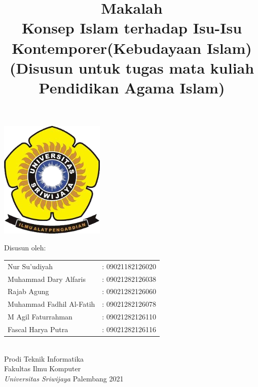 \documentclass[a4paper,12 pt]{article}%
\title{\textbf{Makalah}\linebreak \\ 
\textbf{Konsep Islam terhadap Isu-Isu Kontemporer(Kebudayaan Islam)}\\[1\baselineskip] 
\normalsize{\textbf{(Disusun untuk tugas mata kuliah Pendidikan Agama Islam)}}}
\date{}
\author{}
\begin{document}
\maketitle
{}%
\thispagestyle{empty}%

\begin{center}%
\includegraphics[width=5cm]{unsri.png}
\end{center}
\vspace{1 cm}


\begin{center}
    Disusun oleh:\\[1\baselineskip]
\begin{tabular}{ll} %
Nur Su'udiyah &: 09021182126020\\
Muhammad Dary Alfaris &: 09021282126038\\
Rajab Agung &: 09021282126060\\
Muhammad Fadhil Al-Fatih &: 09021282126078\\
M Agil Faturrahman &: 09021282126110\\
Fascal Harya Putra &: 09021282126116
\end{tabular}\\[2\baselineskip]

Prodi Teknik Informatika\\
Fakultas Ilmu Komputer\\ 
\textit{Universitas Sriwijaya}\linebreak 
Palembang 2021\linebreak 
\end{center}
\clearpage%
\end{document}
